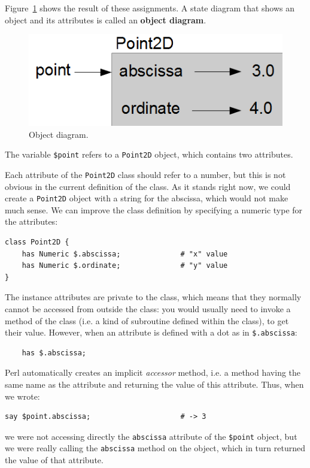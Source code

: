 Figure~\ref{fig.point2d} shows the result of these assignments.
A state diagram that shows an object and its attributes is
called an {\bf object diagram}.

\begin{figure}
\centerline
{\includegraphics[scale=0.8]{figs/point2D.png}}
\caption{Object diagram.}
\label{fig.point2d}
\end{figure}

The variable {\tt \$point} refers to a {\tt Point2D} object, 
which contains two attributes.  

Each attribute of the {\tt Point2D} class should refer to a 
number, but this is not obvious in the current definition of 
the class. As it stands right now, we could create a {\tt Point2D} 
object with a string for the abscissa, which would not make 
much sense. We can improve the class definition by specifying 
a numeric type for the attributes:
%
\begin{verbatim}
class Point2D {
    has Numeric $.abscissa;              # "x" value
    has Numeric $.ordinate;              # "y" value
}
\end{verbatim}
%
The instance attributes are private to the class, which means 
that they normally cannot be accessed from outside the class: 
you would usually need to invoke a method of the class 
(i.e. a kind of subroutine defined within the class), to get 
their value. However, when an attribute is defined with a dot 
as in \verb'$.abscissa':

\begin{verbatim}
    has $.abscissa;  
\end{verbatim}
%
Perl automatically creates an implicit \emph{accessor} method, 
i.e. a method having the same name as the attribute and returning  
the value of this attribute. Thus, when we wrote:

\begin{verbatim}
say $point.abscissa;                     # -> 3
\end{verbatim}
%
we were not accessing directly the {\tt abscissa} attribute of 
the \verb'$point' object, but we were really calling the 
{\tt abscissa} method on the object, which in turn returned 
the value of that attribute.

